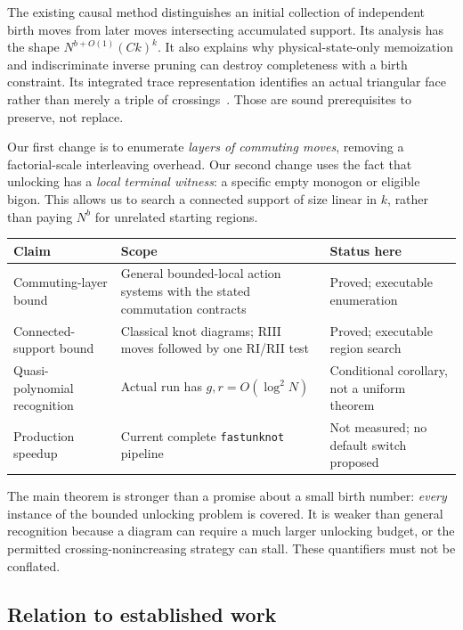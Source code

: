 \documentclass[11pt]{article}
\theoremstyle{definition}
\newcommand{\code}[1]{\texttt{#1}}
\begin{document}
The existing causal method distinguishes an initial collection of independent
birth moves from later moves intersecting accumulated support. Its analysis
has the shape $N^{b+O(1)}(Ck)^k$. It also explains why physical-state-only
memoization and indiscriminate inverse pruning can destroy completeness with
a birth constraint. Its integrated trace representation identifies an actual
triangular face rather than merely a triple of crossings~\cite{repo-causal}.
Those are sound prerequisites to preserve, not replace.

Our first change is to enumerate \emph{layers of commuting moves}, removing a
factorial-scale interleaving overhead. Our second change uses the fact that
unlocking has a \emph{local terminal witness}: a specific empty monogon or
eligible bigon. This allows us to search a connected support of size linear
in $k$, rather than paying $N^b$ for unrelated starting regions.

\begin{center}
\begin{tabular}{>{\raggedright\arraybackslash}p{}>{\raggedright\arraybackslash}p{}>{\raggedright\arraybackslash}p{}}
\toprule
Claim & Scope & Status here\\
\midrule
Commuting-layer bound & General bounded-local action systems with the stated
commutation contracts & Proved; executable enumeration\\
Connected-support bound & Classical knot diagrams; RIII moves followed by one
RI/RII test & Proved; executable region search\\
Quasi-polynomial recognition & Actual run has $g,r=O(\log^2N)$ & Conditional
corollary, not a uniform theorem\\
Production speedup & Current complete \code{fastunknot} pipeline & Not measured;
no default switch proposed\\
\bottomrule
\end{tabular}
\end{center}

The main theorem is stronger than a promise about a small birth number:
\emph{every} instance of the bounded unlocking problem is covered. It is
weaker than general recognition because a diagram can require a much larger
unlocking budget, or the permitted crossing-nonincreasing strategy can stall.
These quantifiers must not be conflated.

\subsection{Relation to established work}
\end{document}
